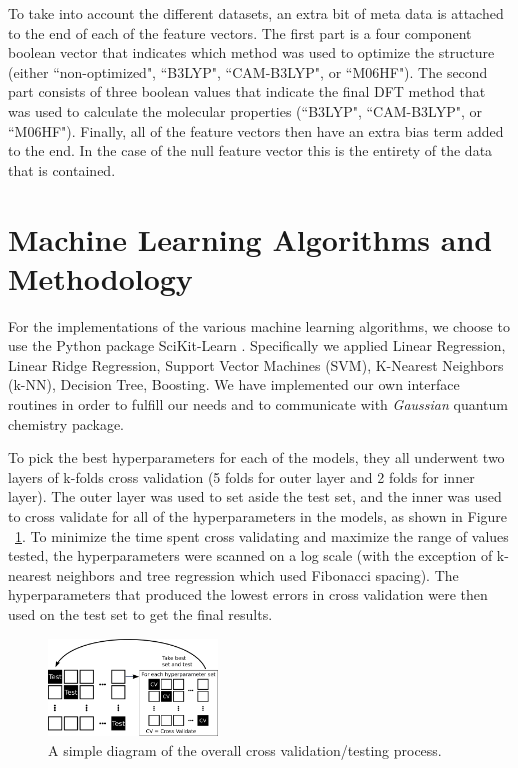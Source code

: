 \documentclass[10pt, oneside]{article}   	%
\begin{document}
To take into account the different datasets, an extra bit of meta data is attached to the end of each of the feature vectors. The first part is a four component boolean vector that indicates which method was used to optimize the structure (either ``non-optimized", ``B3LYP", ``CAM-B3LYP", or ``M06HF"). The second part consists of three boolean values that indicate the final DFT method that was used to calculate the molecular properties (``B3LYP", ``CAM-B3LYP", or ``M06HF"). Finally, all of the feature vectors then have an extra bias term added to the end. In the case of the null feature vector this is the entirety of the data that is contained.





\section{Machine Learning Algorithms and Methodology}

\noindent For the implementations of the various machine learning algorithms, we choose to use the Python package SciKit-Learn \cite{scikit-learn}. Specifically we applied Linear Regression, Linear Ridge Regression, Support Vector Machines (SVM), K-Nearest Neighbors (k-NN), Decision Tree, Boosting. We have implemented our own interface routines in order to fulfill our needs and to communicate with \textit{Gaussian} quantum chemistry package.

To pick the best hyperparameters for each of the models, they all underwent two layers of k-folds cross validation (5 folds for outer layer and 2 folds for inner layer). The outer layer was used to set aside the test set, and the inner was used to cross validate for all of the hyperparameters in the models, as shown in Figure ~\ref{crossvalidation}. To minimize the time spent cross validating and maximize the range of values tested, the hyperparameters were scanned on a log scale (with the exception of k-nearest neighbors and tree regression which used Fibonacci spacing). The hyperparameters that produced the lowest errors in cross validation were then used on the test set to get the final results.

\begin{figure}[H]
\begin{center}
\includegraphics [width=0.4\textwidth]{crossvalidation.png}
\caption{A simple diagram of the overall cross validation/testing process.}\label{crossvalidation}
\end{center}
\end{figure}
\end{document}
